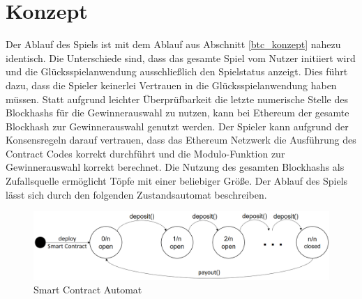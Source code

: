 \section{Konzept} \label{eth_konzept}

Der Ablauf des Spiels ist mit dem Ablauf aus Abschnitt \ref{btc_konzept} nahezu identisch. Die Unterschiede sind, dass das gesamte Spiel vom Nutzer initiiert wird und die Glücksspielanwendung ausschließlich den Spielstatus anzeigt. Dies führt dazu, dass die Spieler keinerlei Vertrauen in die Glücksspielanwendung haben müssen. Statt aufgrund leichter Überprüfbarkeit die letzte numerische Stelle des Blockhashs für die Gewinnerauswahl zu nutzen, kann bei Ethereum der gesamte Blockhash zur Gewinnerauswahl genutzt werden. Der Spieler kann aufgrund der Konsensregeln darauf vertrauen, dass das Ethereum Netzwerk die Ausführung des Contract Codes korrekt durchführt und die Modulo-Funktion zur Gewinnerauswahl korrekt berechnet. Die Nutzung des gesamten Blockhashs als Zufallsquelle ermöglicht Töpfe mit einer beliebiger Größe. 
Der Ablauf des Spiels lässt sich durch den folgenden Zustandsautomat beschreiben.

\begin{figure}[H]
\centering
\includegraphics[width=1\linewidth]{Figures/umsetzung_eth/smart_contract_automat_idea}
\decoRule
\caption{Smart Contract Automat}
\label{fig:smart_contract_automat_idea}
\end{figure}

